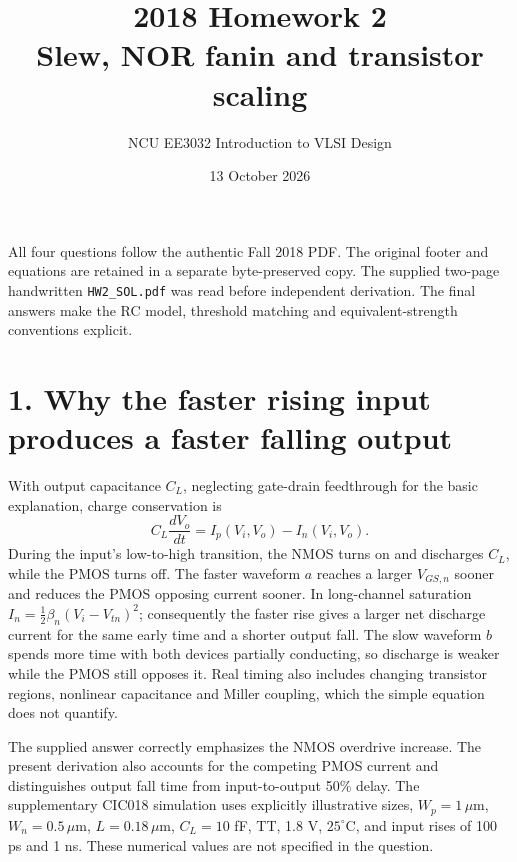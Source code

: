 \documentclass[11pt,a4paper]{article}
\title{2018 Homework 2\\Slew, NOR fanin and transistor scaling}
\author{NCU EE3032 Introduction to VLSI Design}\date{13 October 2026}
\newcommand{\VDD}{V_{\mathrm{DD}}}
\begin{document}
\maketitle
All four questions follow the authentic Fall 2018 PDF. The original footer
and equations are retained in a separate byte-preserved copy. The supplied
two-page handwritten \texttt{HW2\_SOL.pdf} was read before independent
derivation. The final answers make the RC model, threshold matching and
equivalent-strength conventions explicit.

\section*{1. Why the faster rising input produces a faster falling output}
With output capacitance $C_L$, neglecting gate-drain feedthrough for the
basic explanation, charge conservation is
\[
 C_L\frac{dV_o}{dt}=I_p(V_i,V_o)-I_n(V_i,V_o).
\]
During the input's low-to-high transition, the NMOS turns on and discharges
$C_L$, while the PMOS turns off. The faster waveform $a$ reaches a larger
$V_{GS,n}$ sooner and reduces the PMOS opposing current sooner.
In long-channel saturation $I_n=\frac12\beta_n(V_i-V_{tn})^2$; consequently
the faster rise gives a larger net discharge current for the same early time
and a shorter output fall. The slow waveform $b$ spends more time with both
devices partially conducting, so discharge is weaker while the PMOS still
opposes it. Real timing also includes changing transistor regions, nonlinear
capacitance and Miller coupling, which the simple equation does not quantify.

\begin{center}\end{center}
The supplied answer correctly emphasizes the NMOS overdrive increase.
The present derivation also accounts for the competing PMOS current and
distinguishes output fall time from input-to-output 50\% delay.
The supplementary CIC018 simulation uses explicitly illustrative sizes,
$W_p=1\,\mu$m, $W_n=0.5\,\mu$m, $L=0.18\,\mu$m, $C_L=10$ fF,
TT, 1.8 V, $25^\circ$C, and input rises of 100 ps and 1 ns.
These numerical values are not specified in the question.
\end{document}
